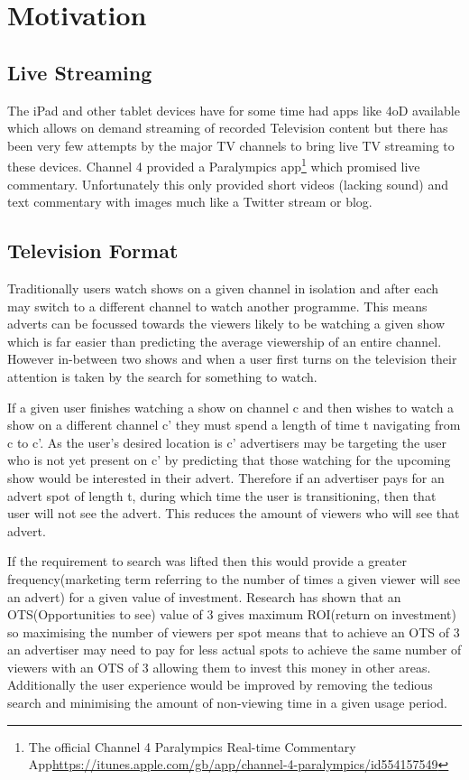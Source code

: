 \section{Motivation}

\subsection{Live Streaming}
The iPad and other tablet devices have for some time had apps like 4oD available which allows on demand streaming of recorded Television content but there has been very few attempts by the major TV channels to bring live TV streaming to these devices. Channel 4 provided a Paralympics app\footnote{The official Channel 4 Paralympics Real-time Commentary App\url{https://itunes.apple.com/gb/app/channel-4-paralympics/id554157549}} which promised live commentary. Unfortunately this only provided short videos (lacking sound) and text commentary with images much like a Twitter stream or blog.

\subsection{Television Format}
Traditionally users watch shows on a given channel in isolation and after each may switch to a different channel to watch another programme. This means adverts can be focussed towards the viewers likely to be watching a given show which is far easier than predicting the average viewership of an entire channel. However in-between two shows and when a user first turns on the television their attention is taken by the search for something to watch.

If a given user finishes watching a show on channel c and then wishes to watch a show on a different channel c' they must spend a length of time t navigating from c to c'. As the user's desired location is c' advertisers may be targeting the user who is not yet present on c' by predicting that those watching for the upcoming show would be interested in their advert. Therefore if an advertiser pays for an advert spot of length t, during which time the user is transitioning, then that user will not see the advert. This reduces the amount of viewers who will see that advert.

If the requirement to search was lifted then this would provide a greater frequency(marketing term referring to the number of times a given viewer will see an advert) for a given value of investment. Research has shown that an OTS(Opportunities to see) value of 3 gives maximum ROI(return on investment) so maximising the number of viewers per spot means that to achieve an OTS of 3 an advertiser may need to pay for less actual spots to achieve the same number of viewers with an OTS of 3 allowing them to invest this money in other areas. Additionally the user experience would be improved by removing the tedious search and minimising the amount of non-viewing time in a given usage period.

